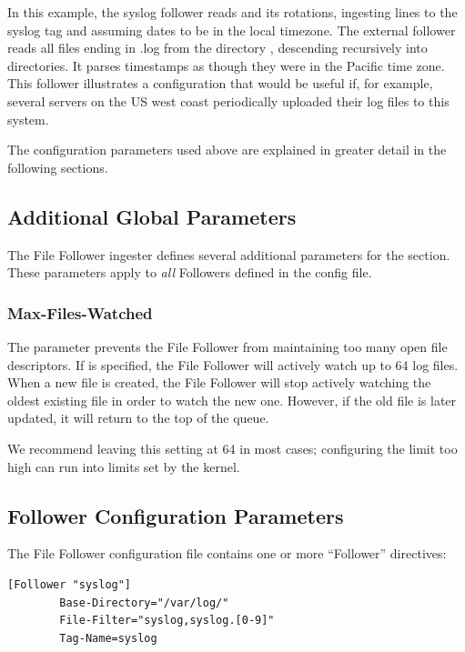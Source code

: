 In this example, the syslog follower reads  and
its rotations, ingesting lines to the syslog tag and assuming dates to
be in the local timezone. The external follower reads all files ending
in .log from the directory , descending recursively
into directories. It parses timestamps as though they were in the
Pacific time zone. This follower illustrates a configuration that would
be useful if, for example, several servers on the US west coast
periodically uploaded their log files to this system.

The configuration parameters used above are explained in greater detail
in the following sections.

\subsection{Additional Global Parameters}

The File Follower ingester defines several additional parameters for
the \code{[Global]} section. These parameters apply to \emph{all} Followers
defined in the config file.

\subsubsection{Max-Files-Watched}

The  parameter prevents the File Follower from
maintaining too many open file descriptors. If
 is specified, the File Follower will actively
watch up to 64 log files. When a new file is created, the File Follower
will stop actively watching the oldest existing file in order to watch
the new one. However, if the old file is later updated, it will return
to the top of the queue.

We recommend leaving this setting at 64 in most cases; configuring the
limit too high can run into limits set by the kernel.

\subsection{Follower Configuration Parameters}

The File Follower configuration file contains one or more ``Follower''
directives:

\begin{Verbatim}[breaklines=true]
[Follower "syslog"]
        Base-Directory="/var/log/"
        File-Filter="syslog,syslog.[0-9]"
        Tag-Name=syslog
\end{Verbatim}

